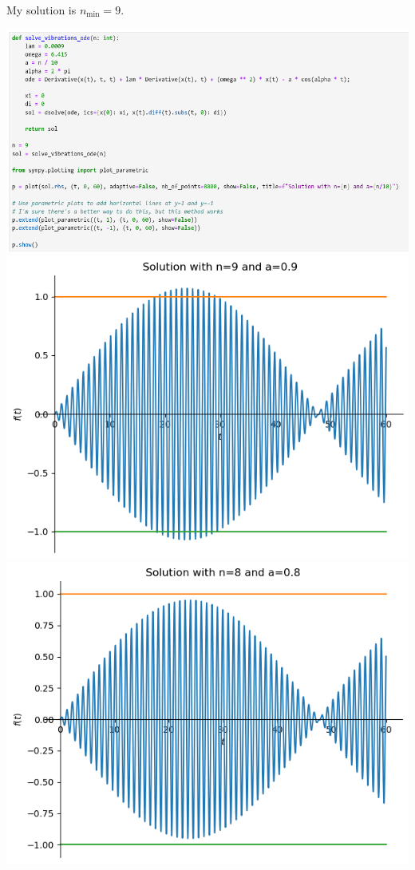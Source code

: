 \documentclass[a4paper]{article}
\begin{document}
My solution is $n_\text{min} = 9$.

\includegraphics[scale=0.45]{Q3-b}
\includegraphics[scale=0.8]{n9}
\includegraphics[scale=0.8]{n8}
\end{document}
